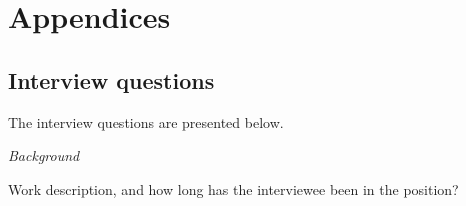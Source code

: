 
\chapter*{Appendices}
\thispagestyle{headings}

\listofappendices{}
\clearpage


\renewcommand\thesection{\Alph{section}}

\section{Interview questions}
\label{sec:appA}
The interview questions are presented below.
\bigskip

\noindent\emph{Background}
\vspace{-3mm} 
\begin{list}{*}{}
\setlength{\itemsep}{-3pt}
 \item Work description, and how long has the interviewee been in the position?
\end{list}

